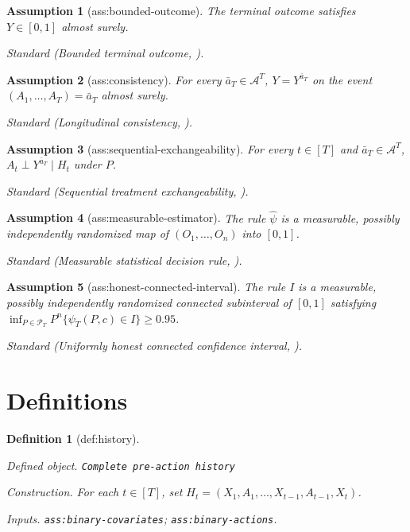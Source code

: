 \documentclass{article}
\newtheorem{assumption}{Assumption}
\newtheorem{definition}{Definition}
\begin{document}
\begin{assumption}[ass:bounded-outcome]\label{ass:bounded-outcome}
The terminal outcome satisfies \(Y\in[0,1]\) almost surely.
\par\smallskip\noindent\emph{Standard} (Bounded terminal outcome, \cite{KimKennedyNaimi2021}).
\end{assumption}

\begin{assumption}[ass:consistency]\label{ass:consistency}
For every \(\bar a_T\in\mathcal A^T\), \(Y=Y^{\bar a_T}\) on the event \((A_1,\ldots,A_T)=\bar a_T\) almost surely.
\par\smallskip\noindent\emph{Standard} (Longitudinal consistency, \cite{KimKennedyNaimi2021}).
\end{assumption}

\begin{assumption}[ass:sequential-exchangeability]\label{ass:sequential-exchangeability}
For every \(t\in[T]\) and \(\bar a_T\in\mathcal A^T\), \(A_t\perp Y^{\bar a_T}\mid H_t\) under \(P\).
\par\smallskip\noindent\emph{Standard} (Sequential treatment exchangeability, \cite{KimKennedyNaimi2021}).
\end{assumption}

\begin{assumption}[ass:measurable-estimator]\label{ass:measurable-estimator}
The rule \(\widehat\psi\) is a measurable, possibly independently randomized map of \((O_1,\ldots,O_n)\) into \([0,1]\).
\par\smallskip\noindent\emph{Standard} (Measurable statistical decision rule, \cite{MaZhuJiaoWainwright2022}).
\end{assumption}

\begin{assumption}[ass:honest-connected-interval]\label{ass:honest-connected-interval}
The rule \(I\) is a measurable, possibly independently randomized connected subinterval of \([0,1]\) satisfying \(\inf_{P\in\mathcal P_T}P^n\{\psi_T(P,c)\in I\}\geq0.95\).
\par\smallskip\noindent\emph{Standard} (Uniformly honest connected confidence interval, \cite{CaiLow2004}).
\end{assumption}

\section{Definitions}

\begin{definition}[def:history]\label{def:history}
\par\smallskip\noindent\emph{Defined object.} \texttt{Complete pre-\allowbreak{}action history}
\par\smallskip\noindent\emph{Construction.} For each \(t\in[T]\), set \(H_t=(X_1,A_1,\ldots,X_{t-1},A_{t-1},X_t)\).
\par\smallskip\noindent\emph{Inputs.} \texttt{ass:\allowbreak{}binary-\allowbreak{}covariates}; \texttt{ass:\allowbreak{}binary-\allowbreak{}actions}.
\end{definition}
\end{document}
